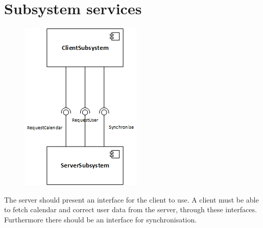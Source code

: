 \documentclass[10pt]{report}
\numberwithin{equation}{section} %
\numberwithin{figure}{section} %
\numberwithin{table}{section} %
\begin{document}
\section{Subsystem services}
\begin{center}
  \begin{figure}[H]
    \includegraphics[scale=1.0]{figures/subsystemservices.png}
  \end{figure}
\end{center}

The server should present an interface for the client to use.  A client must be
able to fetch calendar and correct user data from the server, through these
interfaces. Furthermore there should be an interface for synchronisation.

\end{document}

